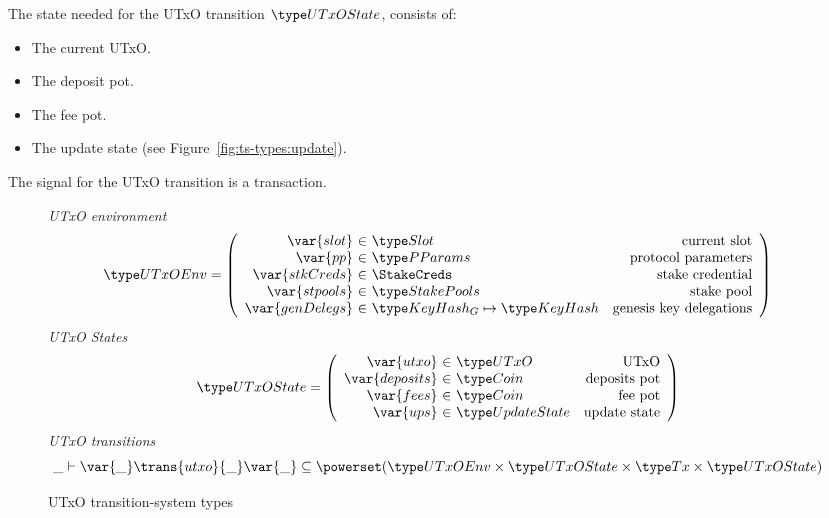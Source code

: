 The state needed for the UTxO transition $\UTxOState$, consists of:

\begin{itemize}
  \item The current UTxO.
  \item The deposit pot.
  \item The fee pot.
  \item The update state (see Figure~\ref{fig:ts-types:update}).
\end{itemize}
The signal for the UTxO transition is a transaction.

\begin{figure}[htb]
  \emph{UTxO environment}
  \begin{equation*}
    \UTxOEnv =
    \left(
      \begin{array}{r@{~\in~}lr}
        \var{slot} & \Slot & \text{current slot}\\
        \var{pp} & \PParams & \text{protocol parameters}\\
        \var{stkCreds} & \StakeCreds & \text{stake credential}\\
        \var{stpools} & \StakePools & \text{stake pool}\\
        \var{genDelegs} & \KeyHashGen\mapsto\KeyHash & \text{genesis key delegations} \\
      \end{array}
    \right)
  \end{equation*}
  \emph{UTxO States}
  \begin{equation*}
    \UTxOState =
    \left(
      \begin{array}{r@{~\in~}lr}
        \var{utxo} & \UTxO & \text{UTxO}\\
        \var{deposits} & \Coin & \text{deposits pot}\\
        \var{fees} & \Coin & \text{fee pot}\\
        \var{ups} & \UpdateState & \text{update state}\\
      \end{array}
    \right)
  \end{equation*}
  \emph{UTxO transitions}
  \begin{equation*}
    \_ \vdash
    \var{\_} \trans{utxo}{\_} \var{\_}
    \subseteq \powerset (\UTxOEnv \times \UTxOState \times \Tx \times \UTxOState)
  \end{equation*}
  \caption{UTxO transition-system types}
  \label{fig:ts-types:utxo-shelley}
\end{figure}

